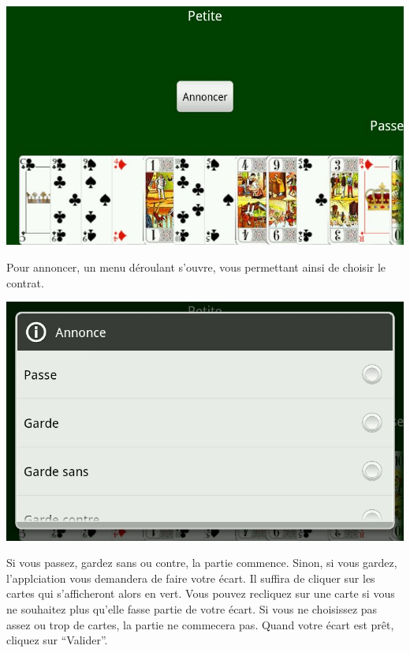\documentclass[a4paper]{report}
\begin{document}
		\begin{center}
			\includegraphics[scale=0.4]{Images/annonce.jpg}\\
		\end{center}
Pour annoncer, un menu déroulant s’ouvre, vous permettant ainsi de choisir le contrat. \\
		\begin{center}
			\includegraphics[scale=0.4]{Images/annonce2.jpg}\\
		\end{center}
Si vous passez, gardez sans ou contre, la partie commence. Sinon, si vous gardez, l’applciation vous demandera de faire votre écart. Il suffira de cliquer sur les cartes qui s’afficheront alors en vert. Vous pouvez recliquez sur une carte si vous ne souhaitez plus qu’elle fasse partie de votre écart. Si vous ne choisissez pas assez ou trop de cartes, la partie ne commecera pas. Quand votre écart est prêt, cliquez sur “Valider”.\\
\end{document}
